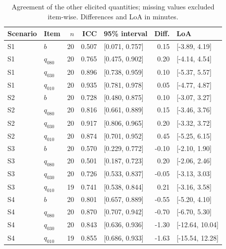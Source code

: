 \begin{table}[tb]
\centering
\caption{Agreement of the other elicited quantities; missing values excluded item-wise. Differences and LoA in minutes.}
\label{tab:reliability20-secondary}
\scriptsize\setlength{\tabcolsep}{3pt}
\begin{tabular}{@{}llrrlrl@{}}
\toprule
Scenario & Item & $n$ & ICC & 95\% interval & Diff. & LoA\\\midrule
S1 & $b$ & 20 & 0.507 & [0.071, 0.757] & 0.15 & [-3.89, 4.19]\\
S1 & $q_{080}$ & 20 & 0.765 & [0.475, 0.902] & 0.20 & [-4.14, 4.54]\\
S1 & $q_{030}$ & 20 & 0.896 & [0.738, 0.959] & 0.10 & [-5.37, 5.57]\\
S1 & $q_{010}$ & 20 & 0.935 & [0.781, 0.978] & 0.05 & [-4.77, 4.87]\\
S2 & $b$ & 20 & 0.728 & [0.480, 0.875] & 0.10 & [-3.07, 3.27]\\
S2 & $q_{080}$ & 20 & 0.816 & [0.661, 0.889] & 0.15 & [-3.46, 3.76]\\
S2 & $q_{030}$ & 20 & 0.917 & [0.806, 0.965] & 0.20 & [-3.32, 3.72]\\
S2 & $q_{010}$ & 20 & 0.874 & [0.701, 0.952] & 0.45 & [-5.25, 6.15]\\
S3 & $b$ & 20 & 0.570 & [0.229, 0.772] & -0.10 & [-2.10, 1.90]\\
S3 & $q_{080}$ & 20 & 0.501 & [0.187, 0.723] & 0.20 & [-2.06, 2.46]\\
S3 & $q_{030}$ & 20 & 0.726 & [0.533, 0.837] & -0.05 & [-3.13, 3.03]\\
S3 & $q_{010}$ & 19 & 0.741 & [0.538, 0.844] & 0.21 & [-3.16, 3.58]\\
S4 & $b$ & 20 & 0.801 & [0.657, 0.889] & -0.55 & [-5.20, 4.10]\\
S4 & $q_{080}$ & 20 & 0.870 & [0.707, 0.942] & -0.70 & [-6.70, 5.30]\\
S4 & $q_{030}$ & 20 & 0.843 & [0.636, 0.936] & -1.30 & [-12.64, 10.04]\\
S4 & $q_{010}$ & 19 & 0.855 & [0.686, 0.933] & -1.63 & [-15.54, 12.28]\\
\bottomrule
\end{tabular}
\end{table}
